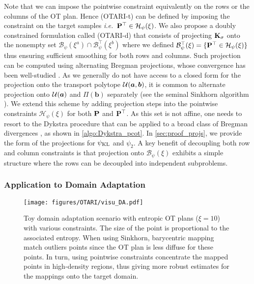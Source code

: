 Note that we can impose the pointwise constraint equivalently on the rows or the columns of the OT plan. Hence (OTARI-t) can be defined by imposing the constraint on the target samples \textit{i.e.}\ ${\mathbf{P}}^\top \in \mathcal{H}_\psi(\xi)$.
We also propose a doubly constrained formulation called (OTARI-d) that consists of projecting ${\mathbf{K}}_\sigma$ onto the nonempty set $\mathcal{B}_\psi(\xi^{a}) \cap \mathcal{B}^\top_\psi(\xi^b)$ 
where we defined $\mathcal{B}^\top_\psi(\xi) = \{ {\mathbf{P}}^\top \in \mathcal{H}_\psi(\xi)\}$ thus ensuring sufficient smoothing for both rows and columns.
Such projection can be computed using alternating Bregman projections, whose convergence has been well-studied \citep{censor1998dykstra, benamou2015iterative}.
As we generally do not have access to a closed form for the projection onto the transport polytope ${\mathcal{U}}(\bm{a}, \bm{b})$, it is common to alternate projection onto ${\mathcal{U}}(\bm{a})$ and $\Pi(\bm{b})$ separately (see \eg the seminal Sinkhorn algorithm \citep{cuturi2013sinkhorn}).
We extend this scheme by adding projection steps into the pointwise constraints $\mathcal{H}_\psi(\xi)$ for both ${\mathbf{P}}$ and ${\mathbf{P}}^\top$. As this set is not affine, one needs to resort to the Dykstra procedure \citep{dykstra1983algorithm} that can be applied to a broad class of Bregman divergences \citep{bauschke2000dykstras}, as shown in \cref{algo:Dykstra_pcot}.
In \cref{sec:proof_projs}, we provide the form of the projections for $\psi_{\operatorname{KL}}$ and $\psi_2$. A key benefit of decoupling both row and column constraints is that projection onto $\mathcal{B}_{\psi}(\xi)$ exhibits a simple structure where the rows can be decoupled into independent subproblems.


\subsubsection{Application to Domain Adaptation}

\begin{figure}[h]
  \begin{center}
  \centerline{\texttt{[image: figures/OTARI/visu\_DA.pdf]}}
  \caption{Toy domain adaptation scenario with entropic OT plans ($\xi=10$) with various constraints. The size of the point is proportional to the associated entropy. When using Sinkhorn, barycentric mapping match outliers points since the OT plan is less diffuse for these points. In turn, using pointwise constraints concentrate the 
   mapped points in high-density regions, thus giving more robust estimates for the mappings onto the target domain.}
  \label{fig:visu_DA}
  \end{center}
\end{figure}

